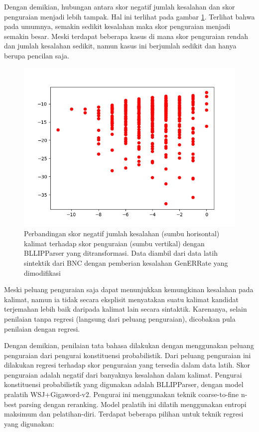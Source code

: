\documentclass[conference]{IEEEtran}
\begin{document}
Dengan demikian, hubungan antara skor negatif jumlah kesalahan dan skor penguraian menjadi lebih tampak. Hal ini terlihat pada gambar \ref{figscoretoparseprobtransformed}. Terlihat bahwa pada umumnya, semakin sedikit kesalahan maka skor penguraian menjadi semakin besar. Meski terdapat beberapa kasus di mana skor penguraian rendah dan jumlah kesalahan sedikit, namun kasus ini berjumlah sedikit dan hanya berupa pencilan saja.

\begin{figure}[h]
\centerline{\includegraphics[width=\columnwidth]{figures/figscoretoparseprobtransformed.png}}
\caption{Perbandingan skor negatif jumlah kesalahan (sumbu horisontal) kalimat terhadap skor penguraian (sumbu vertikal) dengan BLLIPParser yang ditransformasi. Data diambil dari data latih sintektik dari BNC dengan pemberian kesalahan GenERRate yang dimodifikasi}
\label{figscoretoparseprobtransformed}
\end{figure}

Meski peluang penguraian saja dapat menunjukkan kemungkinan kesalahan pada kalimat, namun ia tidak secara eksplisit menyatakan suatu kalimat kandidat terjemahan lebih baik daripada kalimat lain secara sintaktik. Karenanya, selain penilaian tanpa regresi (langsung dari peluang penguraian), dicobakan pula penilaian dengan regresi.

Dengan demikian, penilaian tata bahasa dilakukan dengan menggunakan peluang penguraian dari pengurai konstituensi probabilistik. Dari peluang penguraian ini dilakukan regresi terhadap skor penguraian yang tersedia dalam data latih. Skor penguraian adalah negatif dari banyaknya kesalahan dalam kalimat.
Pengurai konstituensi probabilistik yang digunakan adalah BLLIPParser\cite{b5}\cite{b6}\cite{b7}\cite{b8}, dengan model pralatih WSJ+Gigaword-v2. Pengurai ini menggunakan teknik coarse-to-fine n-best parsing dengan reranking. Model pralatih ini dilatih menggunakan entropi maksimum dan pelatihan-diri.
Terdapat beberapa pilihan untuk teknik regresi yang digunakan:
\end{document}
